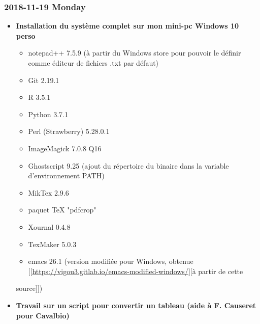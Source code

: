 \documentclass[a4paper]{article}
\begin{document}
\subsubsection*{2018-11-19 Monday}
\label{sec:orgde93fbf}
\begin{itemize}
\item \textbf{Installation du système complet sur mon mini-pc Windows 10 perso}
\label{sec:org833a60d}

\begin{itemize}
\item notepad++ 7.5.9 (à partir du Windows store pour pouvoir le définir comme éditeur de fichiers .txt par défaut)
\item Git 2.19.1
\item R 3.5.1
\item Python 3.7.1
\item Perl (Strawberry) 5.28.0.1
\item ImageMagick 7.0.8 Q16
\item Ghostscript 9.25 (ajout du répertoire du binaire dans la variable d'environnement PATH)
\item MikTex 2.9.6
\item paquet \TeX{} "pdfcrop"
\item Xournal 0.4.8
\item TexMaker 5.0.3
\item emacs 26.1 (version modifiée pour Windows, obtenue [[\url{https://vigou3.gitlab.io/emacs-modified-windows/}][à partir de cette
\end{itemize}
source]])

\item \textbf{Travail sur un script pour convertir un tableau (aide à F. Causeret pour Cavalbio)}
\label{sec:orga138618}
\end{itemize}
\end{document}
